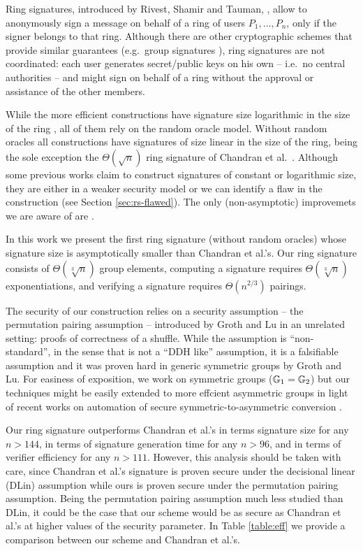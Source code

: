 Ring signatures, introduced by Rivest, Shamir and Tauman, \cite{AC:RivShaTau01}, allow to anonymously sign a message on behalf of a ring of users $P_1,\ldots,P_n$, only if the signer belongs to that ring. Although there are other cryptographic schemes that provide similar guarantees (e.g.~group signatures \cite{EC:ChaVan91}), ring signatures are not coordinated: each user generates secret/public keys on his own -- i.e.~no central authorities -- and might sign on behalf of a ring without the approval or assistance of the other members.

While the more efficient constructions have signature size logarithmic in the size of the ring \cite{EC:GroKoh15,EC:LLNW16}, all of them rely on the {random oracle model}.
Without random oracles all constructions have signatures of size linear in the size of the ring, being the sole exception the $\Theta(\sqrt{n})$ ring signature of Chandran et al.~\cite{ICALP:ChaGroSah07}. 
Although some previous works claim to construct signatures of constant \cite{ACISP:BosDasRan15} or logarithmic \cite{IET:GriSusPla16} size, they are either in a weaker security model or we can identify a flaw in the construction (see Section \ref{sec:rs-flawed}). The only (non-asymptotic) improvemets we are aware of are \cite{TCC:Rafols15,AC:GonHevRaf15}.

In this work we present the first ring signature (without random oracles) whose signature size is asymptotically smaller than Chandran et al.'s. Our ring signature consists of $\Theta(\sqrt[3]{n})$ group elements, computing a signature requires $\Theta(\sqrt[3]{n})$ exponentiations, and verifying a signature requires $\Theta(n^{2/3})$ pairings.

The security of our construction relies on a security assumption -- the {permutation pairing assumption} -- introduced by Groth and Lu \cite{AC:GroLu07} in an unrelated setting: proofs of correctness of a shuffle. While the assumption is ``non-standard'', in the sense that is not a ``DDH like'' assumption, it is a falsifiable assumption and it was proven hard in generic symmetric groups by Groth and Lu. For easiness of exposition, we work on symmetric groups ($\mathbb{G}_1=\mathbb{G}_2$) but our techniques might be easily extended to more effcient asymmetric groups in light of recent works on automation of secure symmetric-to-asymmetric conversion \cite{C:AGOT14a,C:AbeHosOhk16,CCS:AkiGarHoh15}.

Our ring signature outperforms Chandran et al.'s in terms signature size for any $n > 144$, in terms of signature generation time for any $n>96$, and in terms of verifier efficiency for any $n>111$. However, this analysis should be taken with care, since Chandran et al.'s signature is proven secure under the decisional linear (DLin) assumption while ours is proven secure under the permutation pairing assumption. Being the permutation pairing assumption much less studied than DLin, it could be the case that our scheme would be as secure as Chandran et al.'s at higher values of the security parameter. In Table \ref{table:eff} we provide a comparison between our scheme and Chandran et al.'s.


%
